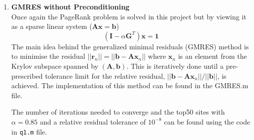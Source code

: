 \documentclass{article}
\begin{document}
\begin{enumerate}
	\item \textbf{GMRES without Preconditioning} \\
	Once again the PageRank problem is solved in this project but by viewing it as a sparse linear system ($\boldsymbol{Ax} = \boldsymbol{b}$)
	$$ (\boldsymbol{I} - \alpha \boldsymbol{G}^T) \boldsymbol{x} = \boldsymbol{1} $$
	The main idea behind the generalized minimal residuals (GMRES) method is to minimise the residual $||\boldsymbol{r}_n || = || \boldsymbol{b} - \boldsymbol{Ax}_n || $ where $\boldsymbol{x}_n$ is an element from the Krylov subspace spanned by $(\boldsymbol{A},\boldsymbol{b})$. This is iteratively done until a pre-prescribed tolerance limit for the relative residual, $||\boldsymbol{b} - \boldsymbol{Ax}_n|| / || \boldsymbol{b} ||$, is achieved. The implementation of this method can be found in the GMRES.m file. 
	
	The number of iterations needed to converge and the top50 sites with $\alpha = 0.85$ and a relative residual tolerance of $10^{-8}$ can be found using the code in \texttt{q1.m} file. 


\end{enumerate}
\end{document}
